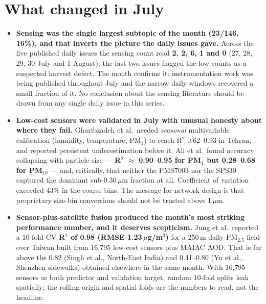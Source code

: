 \documentclass[10pt]{article}
\begin{document}
\vspace{3mm}

\section*{\sffamily\bfseries\color{Deep}What changed in July}
\vspace{-1.5mm}{\color{Coral}\rule{\linewidth}{1.1pt}}\vspace{2.5mm}

\footnotesize
\begin{itemize}
\item \textbf{Sensing was the single largest subtopic of the month (23/146, 16\%), and
that inverts the picture the daily issues gave.} Across the five published daily issues
the sensing count read \textbf{2, 2, 6, 1 and 0} (27, 28, 29, 30 July and 1 August); the
last two issues flagged the low counts as a suspected harvest defect. The month confirms
it: instrumentation work was being published throughout July and the narrow daily windows
recovered a small fraction of it. No conclusion about the sensing literature should be
drawn from any single daily issue in this series.

\item \textbf{Low-cost sensors were validated in July with unusual honesty about where
they fail.} Gharibzadeh et al.\ needed \emph{seasonal} multivariable calibration
(humidity, temperature, PM$_1$) to reach R$^2$ 0.62--0.93 in Tehran, and reported
persistent underestimation before it. Ali et al.\ found accuracy collapsing with particle
size --- \textbf{R$^2$ $\approx$ 0.90--0.95 for PM$_1$ but 0.28--0.68 for PM$_{10}$} ---
and, critically, that neither the PMS7003 nor the SPS30 captured the dominant
sub-0.30\,$\mu$m fraction at all. Coefficient of variation exceeded 43\% in the coarse
bins. The message for network design is that proprietary size-bin conversions should not
be trusted above 1\,$\mu$m.

\item \textbf{Sensor-plus-satellite fusion produced the month's most striking
performance number, and it deserves scepticism.} Jung et al.\ reported a 10-fold CV
\textbf{R$^2$ of 0.98 (RMSE 1.23\,$\mu$g/m$^3$)} for a 250\,m daily PM$_{2.5}$ field over
Taiwan built from 16{,}795 low-cost sensors plus MAIAC AOD. That is far above the
0.82 (Singh et al., North-East India) and 0.41--0.80 (Yu et al., Shenzhen sidewalks)
obtained elsewhere in the same month. With 16{,}795 sensors as both predictor and
validation target, random 10-fold splits leak spatially; the rolling-origin and spatial
folds are the numbers to read, not the headline.


\end{itemize}
\end{document}
